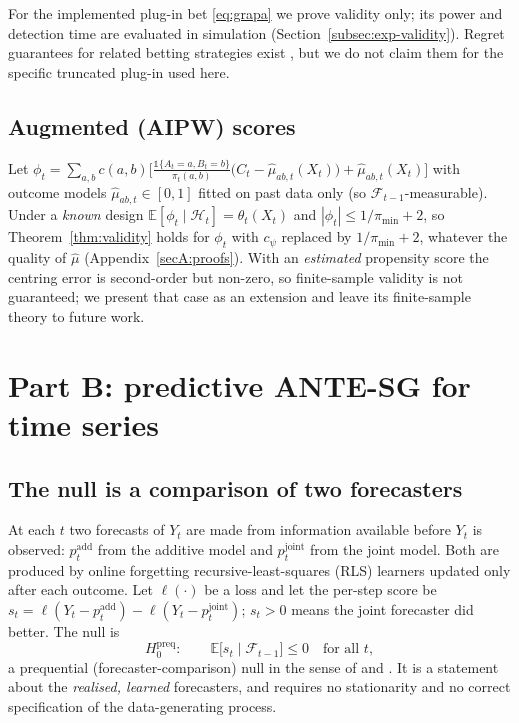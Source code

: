 \documentclass[pdflatex,sn-mathphys-ay]{sn-jnl}%
\theoremstyle{thmstyleone}%
\theoremstyle{thmstyletwo}%
\theoremstyle{thmstylethree}%
\newcommand{\E}{\mathbb{E}}
\newcommand{\F}{\mathcal{F}}
\newcommand{\indic}{\mathbb{1}}
\begin{document}
For the implemented plug-in bet \eqref{eq:grapa} we prove validity only; its power and
detection time are evaluated in simulation (Section~\ref{subsec:exp-validity}). Regret
guarantees for related betting strategies exist \citep{waudbysmith2024}, but we do not
claim them for the specific truncated plug-in used here.

\subsection{Augmented (AIPW) scores}\label{subsec:aipw}

Let $\phi_t=\sum_{a,b}c(a,b)\bigl[\tfrac{\indic\{A_t=a,B_t=b\}}{\pi_t(a,b)}
\bigl(C_t-\hat\mu_{ab,t}(X_t)\bigr)+\hat\mu_{ab,t}(X_t)\bigr]$ with outcome models
$\hat\mu_{ab,t}\in[0,1]$ fitted on past data only (so $\F_{t-1}$-measurable). Under a
\emph{known} design $\E[\phi_t\mid\mathcal H_t]=\theta_t(X_t)$ and $|\phi_t|\le1/\pi_{\min}+2$,
so Theorem~\ref{thm:validity} holds for $\phi_t$ with $c_\psi$ replaced by $1/\pi_{\min}+2$, whatever the quality of
$\hat\mu$ (Appendix~\ref{secA:proofs}). With an \emph{estimated} propensity score the
centring error is second-order but non-zero, so finite-sample validity is not guaranteed;
we present that case as an extension and leave its finite-sample theory to future work.

\section{Part B: predictive ANTE-SG for time series}\label{sec:partB}

\subsection{The null is a comparison of two forecasters}\label{subsec:sgnull}

At each $t$ two forecasts of $Y_t$ are made from information available before $Y_t$ is
observed: $p^{\mathrm{add}}_t$ from the additive model and $p^{\mathrm{joint}}_t$ from the
joint model. Both are produced by online forgetting recursive-least-squares (RLS)
learners \citep{ljung1999} updated only after each outcome. Let $\ell(\cdot)$ be a loss and
let the per-step score be $s_t=\ell(Y_t-p^{\mathrm{add}}_t)-\ell(Y_t-p^{\mathrm{joint}}_t)$; $s_t>0$
means the joint forecaster did better. The null is
\begin{equation}\label{eq:preq}
H_0^{\mathrm{preq}}:\qquad \E\big[s_t\mid\F_{t-1}\big]\le0\quad\text{for all }t ,
\end{equation}
a prequential (forecaster-comparison) null in the sense of \citet{dawid1984} and
\citet{choe2024}. It is a statement about the \emph{realised, learned} forecasters, and
requires no stationarity and no correct specification of the data-generating process.
\end{document}
